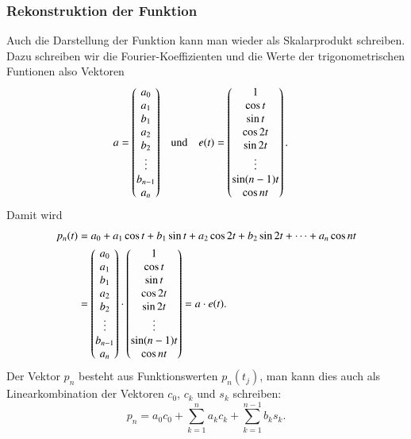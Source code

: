 \subsubsection{Rekonstruktion der Funktion}
Auch die Darstellung der Funktion kann man wieder als Skalarprodukt schreiben.
Dazu schreiben wir die Fourier-Koeffizienten und die Werte der
trigonometrischen Funtionen also Vektoren
\[
\begin{aligned}
a
&=
\begin{pmatrix}
a_0\mathstrut\\
a_1\mathstrut\\
b_1\mathstrut\\
a_2\mathstrut\\
b_2\mathstrut\\
\vdots\\
b_{n-1}\mathstrut\\
a_n\mathstrut
\end{pmatrix}
&&\text{und}
&
e(t)
&=
\begin{pmatrix}
1\\
\cos t\\
\sin t\\
\cos2t\\
\sin2t\\
\vdots\\
\sin(n-1)t\\
\cos nt
\end{pmatrix}.
\end{aligned}
\]
Damit wird 
\begin{align*}
p_n(t)
&=
a_0 + a_1\cos t + b_1\sin t + a_2\cos2t+b_2\sin2t+\dots+a_n\cos nt
\\
&=
\begin{pmatrix}
a_0\mathstrut\\
a_1\mathstrut\\
b_1\mathstrut\\
a_2\mathstrut\\
b_2\mathstrut\\
\vdots\\
b_{n-1}\mathstrut\\
a_n\mathstrut
\end{pmatrix}
\cdot
\begin{pmatrix}
1\\
\cos t\\
\sin t\\
\cos2t\\
\sin2t\\
\vdots\\
\sin(n-1)t\\
\cos nt
\end{pmatrix}
=
a\cdot e(t).
\end{align*}
Der Vektor $p_n$ besteht aus Funktionswerten $p_n(t_j)$, man kann dies
auch als Linearkombination der Vektoren $c_0$, $c_k$ und $s_k$ schreiben:
\begin{equation}
p_n = a_0c_0 + \sum_{k=1}^n a_kc_k + \sum_{k=1}^{n-1} b_ks_k.
\label{skript:fourier:pn}
\end{equation}

